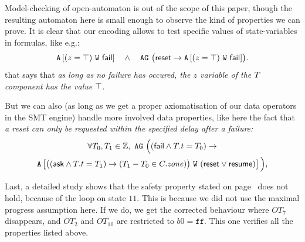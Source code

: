 \documentclass{llncs}
\newcommand{\Eric}{\\\hfill\mdash Eric}
\newcommand{\noteEMin}[2][inline,color=green!40]{\todo[#1]{{#2}\Eric}}
\newcommand{\newCoord}[1]{{\color{blue}#1}}
\newcommand{\fig}[1]{Fig.~\ref{fig:#1}}
\newcommand{\app}[1]{App.~\ref{secn:#1}}
\newcommand{\sZ}{\ensuremath{\mathbb{Z}}}
\newcommand{\mdash}[1][]{---#1}
\newcommand{\false}{\ensuremath{\mathtt{f\!f}}}
\newcommand{\AG}[1][\ ]{\ensuremath{\mathtt{AG}#1}}
\newcommand{\AW}[3][\ ]{\ensuremath{\mathtt{A}\left[#2\ \mathtt{W}\ #3\right]#1}}
\begin{document}
\newCoord{Model-checking of open-automaton is out of the scope of this paper,
though the resulting automaton here is small enough to observe the
kind of properties we can prove. It is clear that our encoding allows
to test specific values of state-variables in formulas, like e.g.:
  \begin{equation}
    \label{eq:prop:z:top}
    \AW[\quad]{(z = \topinterval)}{\PortFail} \land\quad
    \AG \bigl(
    \PortReset \rightarrow \AW[]{(z = \topinterval)}{\PortFail}
    \bigr).
  \end{equation}
that says that \emph{as long as no failure has occured, the $z$ variable of the
$T$ component has the value $\top$}.

But we can also (as long as we get a proper axiomatisation of our data
operators in the SMT engine) handle more involved data properties,
like here the fact that \emph{a reset can only be requested within the
specified delay after a failure:}
  \begin{multline}
    \label{eq:prop:to:delay}
    \forall T_0, T_1 \in \sZ,\
    \AG \Big((\PortFail \land \NameTimer.t = T_0) \rightarrow
    \\
    \AW[]{\bigl((\PortAsk \land \NameTimer.t = T_1) \rightarrow
      (T_1 - T_0 \in \NameCtrl.\mathit{zone})\bigr)
    }{
      (\PortReset \lor \PortResume)
    }\Big),
  \end{multline}
}

Last, a detailed study shows that the safety property stated
on page~\pageref{property:reset} does not hold, because of the
{\PortFail} loop on state $11$.  This is because we did not
use the maximal progress assumption here.  If we do, we get the
corrected behaviour %
where
$OT_7$ disappears, and $OT_2$ and
$OT_{10}$ are restricted to $b0=\false$. This one verifies all
the properties listed above.%



\end{document}

